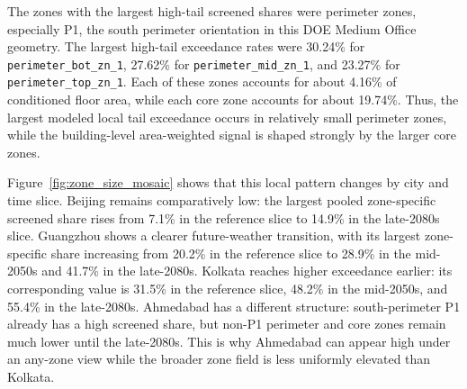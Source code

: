 \begin{table}[htbp]
\centering
\caption{Zone aggregation summary by city. Mean, any-zone, and p90-zone columns report modeled high-tail exceedance at $p_{\mathrm{tail}}\ge0.20$. Any-zone exceedance is the share of occupied timesteps for which the maximum zone value satisfies $\max_z p_{\mathrm{tail},z}\ge0.20$. Hidden high-tail exceedance means the mean-zone value is below 0.20 while at least one zone is at or above 0.20.}
\label{tab:zone_aggregation_summary}
\scriptsize
{}
\end{table}

The zones with the largest high-tail screened shares were perimeter zones, especially P1, the south perimeter orientation in this DOE Medium Office geometry. The largest high-tail exceedance rates were 30.24\% for \texttt{perimeter\_bot\_zn\_1}, 27.62\% for \texttt{perimeter\_mid\_zn\_1}, and 23.27\% for \texttt{perimeter\_top\_zn\_1}. Each of these zones accounts for about 4.16\% of conditioned floor area, while each core zone accounts for about 19.74\%. Thus, the largest modeled local tail exceedance occurs in relatively small perimeter zones, while the building-level area-weighted signal is shaped strongly by the larger core zones.

Figure~\ref{fig:zone_size_mosaic} shows that this local pattern changes by city and time slice. Beijing remains comparatively low: the largest pooled zone-specific screened share rises from 7.1\% in the reference slice to 14.9\% in the late-2080s slice. Guangzhou shows a clearer future-weather transition, with its largest zone-specific share increasing from 20.2\% in the reference slice to 28.9\% in the mid-2050s and 41.7\% in the late-2080s. Kolkata reaches higher exceedance earlier: its corresponding value is 31.5\% in the reference slice, 48.2\% in the mid-2050s, and 55.4\% in the late-2080s. Ahmedabad has a different structure: south-perimeter P1 already has a high screened share, but non-P1 perimeter and core zones remain much lower until the late-2080s. This is why Ahmedabad can appear high under an any-zone view while the broader zone field is less uniformly elevated than Kolkata.

